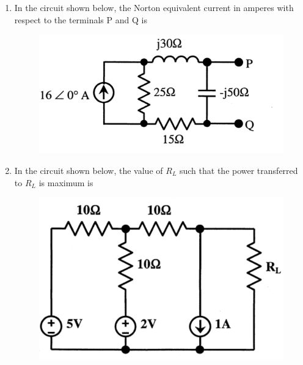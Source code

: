 \documentclass[a4paper, 11pt]{article}
\begin{document}
\begin{enumerate}
    \begin{enumerate}
    \end{enumerate}

    \hfill{}

    \item In the circuit shown below, the Norton equivalent current in amperes with respect to the terminals P and Q is
    
    \begin{figure}[H]
        \centering
        \includegraphics[width=0.5\columnwidth]{figs/q10.png}
        \caption*{}
        \label{fig:q10}
    \end{figure}
    
    \begin{enumerate}
    \end{enumerate}

    \hfill{}

    \item In the circuit shown below, the value of $R_{L}$ such that the power transferred to $R_{L}$ is maximum is
    
    \begin{figure}[H]
        \centering
        \includegraphics[width=0.7\columnwidth]{figs/q11.png}
        \caption*{}
        \label{fig:q11}
    \end{figure}
    

\end{enumerate}
\end{document}
